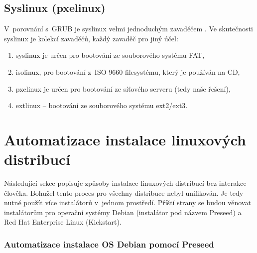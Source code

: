 \subsection{Syslinux (pxelinux)}

V~porovnání s~GRUB je syslinux velmi jednoduchým zavaděčem \cite{syslinux-grub-comparsion}. Ve skutečnosti syslinux je kolekcí zavaděčů, každý zavaděč pro jiný účel:

\begin{enumerate}

\item syslinux je určen  pro bootování ze souborového systému FAT,
\item isolinux, pro bootování z~ISO 9660 filesystému, který je používán na CD,
\item pxelinux je určen pro bootování ze síťového serveru (tedy naše řešení),
\item extlinux -- bootování ze souborového systému ext2/ext3.
\end{enumerate}

\section{Automatizace instalace linuxových distribucí}

Následující sekce popisuje způsoby instalace linuxových distribucí bez interakce člověka. Bohužel tento proces pro všechny distribuce nebyl unifikován. Je tedy nutné použít více instalátorů v~jednom prostředí. Příští strany se budou věnovat instalátorům pro operační systémy Debian (instalátor pod názvem Preseed) a Red Hat Enterprise Linux (Kickstart).


\subsubsection{Automatizace instalace OS Debian pomocí Preseed}

\label{preseed}

